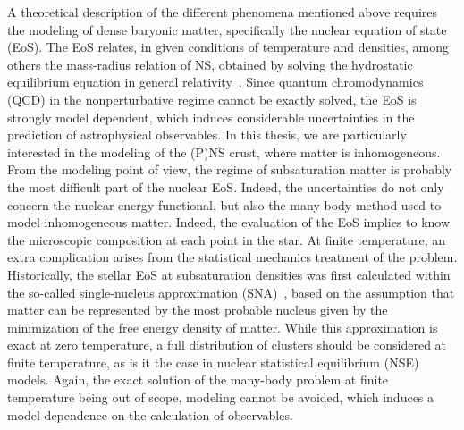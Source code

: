 A theoretical description of the different phenomena mentioned above requires 
the modeling of dense baryonic matter, specifically the nuclear equation of 
state (EoS). 
%
The EoS relates, in given conditions of temperature and 
densities,  among others the mass-radius relation of NS, obtained by solving 
  the hydrostatic equilibrium equation in general 
  relativity~\cite{Tolman1939,Oppenheimer1939}.
%
Since quantum chromodynamics (QCD) in the nonperturbative regime cannot be 
exactly solved, the EoS is strongly model dependent, which induces considerable 
uncertainties in the prediction of astrophysical observables. 
In this thesis, we are particularly interested in the modeling of the (P)NS 
crust, where matter is inhomogeneous. From the modeling point of view, the 
regime of subsaturation matter is probably the most difficult part of the 
nuclear EoS. Indeed, the uncertainties do not only concern the nuclear energy 
functional, but also the many-body method used to model inhomogeneous matter. 
%
Indeed, the evaluation of the EoS implies to know the microscopic composition 
at each point in the star. At finite temperature, an extra complication arises
from the statistical mechanics treatment of the problem. 
Historically, the stellar EoS at subsaturation 
densities was first calculated within the so-called single-nucleus 
approximation (SNA)~\cite{BBP,Negele1973}, based on the assumption that matter 
can be represented by the most probable nucleus given by the minimization of 
the free energy density of matter. While this approximation is exact at zero
temperature, a full distribution of clusters should be considered at finite
temperature, as is it the case in nuclear statistical equilibrium (NSE) models. 
Again, the exact solution of the many-body problem at finite temperature being 
out of scope, modeling cannot be avoided, which induces a model dependence on 
the calculation of observables. 

